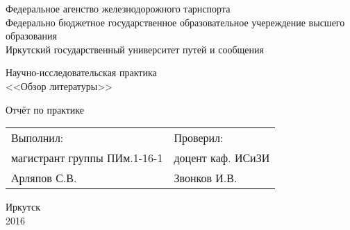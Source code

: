 \begin{titlepage}
	\newpage
	\begin{center}
		Федеральное агенство железнодорожного тарнспорта \\
		\vspace{14pt}
		Федерально бюджетное государственное образовательное учереждение высшего образования \\
		\vspace{14pt}
		Иркутский государственный университет путей и сообщения \\
	\end{center}

	\vspace{14pt}


	\vspace{28pt}

	\begin{center}
		Научно-исследовательская практика \\ <<Обзор литературы>>
	\end{center}

	\vspace{56pt}

	\begin{center}
		Отчёт по практике %
	\end{center}

	\vspace{70pt}

	\begin{flushleft}
		\begin{tabular}{p{}l}
			Выполнил: &  Проверил: \\
			магистрант группы ПИм.1-16-1 &  доцент каф. ИСиЗИ \\
			Арляпов С.В. &  Звонков И.В. \\
		\end{tabular}
	\end{flushleft}

	\vspace{\fill}

	\begin{center}
	Иркутск \\ 2016
	\end{center}
\end{titlepage}
